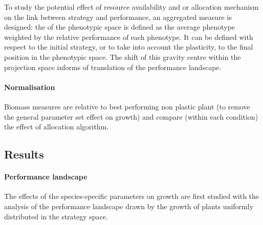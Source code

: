 To study the potential effect of resource availability and or allocation mechanism on the link between strategy and performance, an aggregated measure is designed: the  of the phenotypic space is defined as the average phenotype weighted by the relative performance of each phenotype. It can be defined with respect to the initial strategy, or to take into account the plasticity, to the final position in the phenotypic space. The shift of this gravity centre within the projection space informs of translation of the performance landscape.

\paragraph{Normalisation}

Biomass measures are relative to best performing non plastic plant (to remove the general parameter set effect on growth) and compare (within each condition) the effect of allocation algorithm. %


\subsection{Results}

\paragraph{Performance landscape}
The effects of the species-specific parameters on growth are first studied with the analysis of the performance landscape drawn by the growth of plants uniformly distributed in the strategy space.


